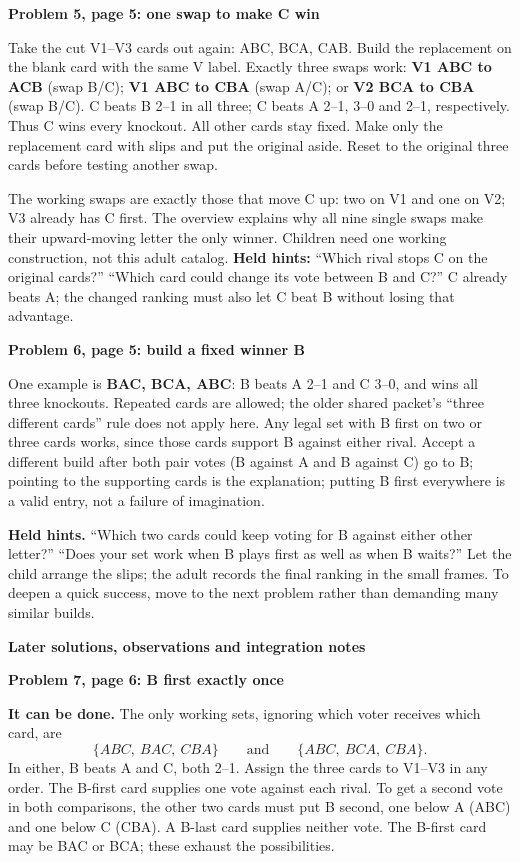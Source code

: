 \documentclass[11pt]{article}
\newcommand{\head}[1]{\par\textbf{\large #1}\par}
\newcommand{\sub}[1]{\par\textbf{#1}\par}
\begin{document}
\sub{Problem 5, page 5: one swap to make C win}
Take the cut V1--V3 cards out again: ABC, BCA, CAB. Build the replacement on the blank card with the same V label. Exactly three swaps work: \textbf{V1 ABC to ACB} (swap B/C); \textbf{V1 ABC to CBA} (swap A/C); or \textbf{V2 BCA to CBA} (swap B/C). C beats B 2--1 in all three; C beats A 2--1, 3--0 and 2--1, respectively. Thus C wins every knockout. All other cards stay fixed. Make only the replacement card with slips and put the original aside. Reset to the original three cards before testing another swap.

The working swaps are exactly those that move C up: two on V1 and one on V2; V3 already has C first. The overview explains why all nine single swaps make their upward-moving letter the only winner. Children need one working construction, not this adult catalog. \textbf{Held hints:} ``Which rival stops C on the original cards?'' ``Which card could change its vote between B and C?'' C already beats A; the changed ranking must also let C beat B without losing that advantage.

\sub{Problem 6, page 5: build a fixed winner B}
One example is \textbf{BAC, BCA, ABC}: B beats A 2--1 and C 3--0, and wins all three knockouts. Repeated cards are allowed; the older shared packet's ``three different cards'' rule does not apply here. Any legal set with B first on two or three cards works, since those cards support B against either rival. Accept a different build after both pair votes (B against A and B against C) go to B; pointing to the supporting cards is the explanation; putting B first everywhere is a valid entry, not a failure of imagination.

\textbf{Held hints.} ``Which two cards could keep voting for B against either other letter?'' ``Does your set work when B plays first as well as when B waits?'' Let the child arrange the slips; the adult records the final ranking in the small frames. To deepen a quick success, move to the next problem rather than demanding many similar builds.

\newpage
\head{Later solutions, observations and integration notes}
\sub{Problem 7, page 6: B first exactly once}
\textbf{It can be done.} The only working sets, ignoring which voter receives which card, are
\[
\{ABC,\ BAC,\ CBA\}\qquad\text{and}\qquad\{ABC,\ BCA,\ CBA\}.
\]
In either, B beats A and C, both 2--1. Assign the three cards to V1--V3 in any order. The B-first card supplies one vote against each rival. To get a second vote in both comparisons, the other two cards must put B second, one below A (ABC) and one below C (CBA). A B-last card supplies neither vote. The B-first card may be BAC or BCA; these exhaust the possibilities.
\end{document}
